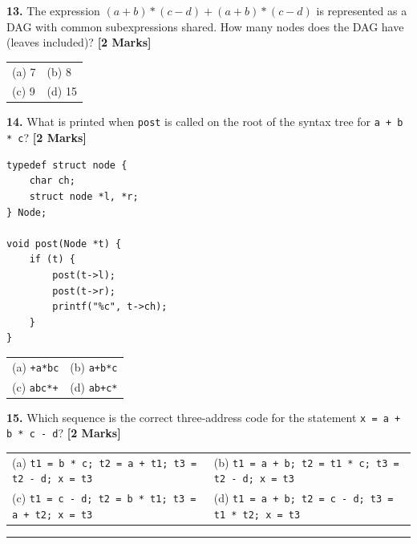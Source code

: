 \documentclass[11pt,a4paper]{article}
\begin{document}
\vspace{0.22cm}

\noindent \textbf{13.} The expression $(a+b)*(c-d) + (a+b)*(c-d)$ is represented as a DAG with common subexpressions shared. How many nodes does the DAG have (leaves included)? \hfill \textbf{[2 Marks]}
\vspace{0.06cm}
\noindent
\begin{tabularx}{\textwidth}{@{}X X@{}}
(a) 7 & (b) 8 \\[3pt]
(c) 9 & (d) 15 \\
\end{tabularx}

\vspace{0.22cm}

\noindent \textbf{14.} What is printed when \texttt{post} is called on the root of the syntax tree for \texttt{a + b * c}? \hfill \textbf{[2 Marks]}
\begin{lstlisting}
typedef struct node {
    char ch;
    struct node *l, *r;
} Node;

void post(Node *t) {
    if (t) {
        post(t->l);
        post(t->r);
        printf("%c", t->ch);
    }
}
\end{lstlisting}
\vspace{0.06cm}
\noindent
\begin{tabularx}{\textwidth}{@{}X X@{}}
(a) \texttt{+a*bc} & (b) \texttt{a+b*c} \\[3pt]
(c) \texttt{abc*+} & (d) \texttt{ab+c*} \\
\end{tabularx}

\vspace{0.22cm}

\noindent \textbf{15.} Which sequence is the correct three-address code for the statement \texttt{x = a + b * c - d}? \hfill \textbf{[2 Marks]}
\vspace{0.06cm}
\noindent
\begin{tabularx}{\textwidth}{@{}X X@{}}
(a) \texttt{t1 = b * c; t2 = a + t1; t3 = t2 - d; x = t3} & (b) \texttt{t1 = a + b; t2 = t1 * c; t3 = t2 - d; x = t3} \\[3pt]
(c) \texttt{t1 = c - d; t2 = b * t1; t3 = a + t2; x = t3} & (d) \texttt{t1 = a + b; t2 = c - d; t3 = t1 * t2; x = t3} \\
\end{tabularx}

\vspace{0.25cm}
\noindent\rule{\textwidth}{0.4pt}
\vspace{0.2cm}
\end{document}
